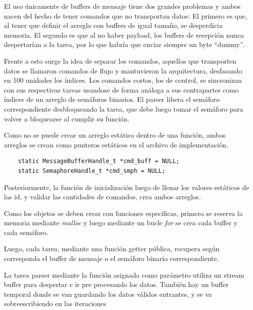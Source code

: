 El uso únicamente de buffers de mensaje tiene dos grandes problemas y ambos nacen del hecho de tener comandos que no transportan datos:
El primero es que, al tener que definir el arreglo con buffers de igual tamaño, se desperdicia memoria. El segundo es que al no haber payload, los buffers de recepción nunca despertarían a la tarea, por lo que habría que enviar siempre un byte \enquote{dummy}.

Frente a esto surge la idea de separar los comandos, aquellos que transporten datos se llamaron comandos de flujo y mantuvieron la arquitectura, desfasando en 100 unidades los índices. 
Los comandos cortos, los de control, se sincronizan con sus respectivas tareas usandose de forma análoga  a sus contrapartes como índices de un arreglo de semáforos binarios. El parser libera el semáforo correspondiente desbloqueando la tarea, que debe luego tomar el semáforo para volver a bloquearse al cumplir su función.

Como no se puede crear un arreglo estático dentro de una función, ambos arreglos se crean como punteros estáticos en el archivo de implementación.

\begin{lstlisting}
	static MessageBufferHandle_t *cmd_buff = NULL;  
	static SemaphoreHandle_t *cmd_smph = NULL; 
\end{lstlisting}

Posteriormente, la función de inicialización luego de  llenar los valores estáticos de las id, y validar las cantidades de comandos, crea ambos arreglos.

Como los objetos se deben crear con funciones específicas, primero se reserva la memoria mediante \textit{malloc} y luego mediante un bucle \textit{for} se crea cada buffer y cada semáforo.

Luego, cada tarea, mediante una función getter pública, recupera según corresponda el buffer de mensaje o el semáforo binario correspondiente.

La tarea parser mediante la función asignada como parámetro utiliza un stream buffer  para despertar e ir pre procesando los datos. También hay un buffer temporal donde se van guardando los datos válidos entrantes, y se va sobreescribiendo en las iteraciones



